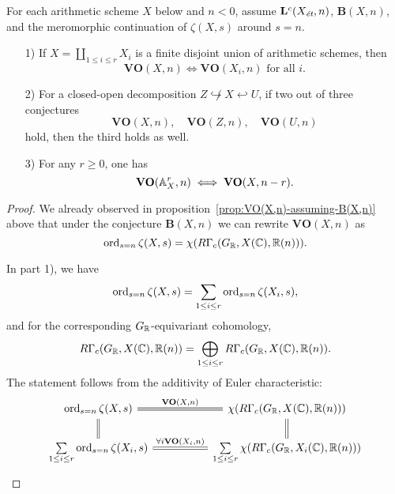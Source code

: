 \documentclass{article}
\numberwithin{equation}{section}
\begin{document}
\begin{proposition}
  \label{prop:compatibility-of-VO(X,n)}
  For each arithmetic scheme $X$ below and $n < 0$, assume
  $\mathbf{L}^c (X_\et,n)$, $\mathbf{B} (X,n)$, and the meromorphic continuation
  of $\zeta (X,s)$ around $s = n$.

  \begin{enumerate}
  \item[1)] If $X = \coprod_{1 \le i \le r} X_i$ is a finite disjoint union of
    arithmetic schemes, then
    $$\mathbf{VO} (X,n) \iff \mathbf{VO} (X_i,n)\text{ for all }i.$$

  \item[2)] For a closed-open decomposition
    $Z \not\hookrightarrow X \hookleftarrow U$, if two out of three conjectures
    \[ \mathbf{VO} (X,n), \quad
      \mathbf{VO} (Z,n), \quad
      \mathbf{VO} (U,n) \]
    hold, then the third holds as well.

  \item[3)] For any $r \ge 0$, one has
    $$\mathbf{VO} (\AA^r_X, n) \iff \mathbf{VO} (X, n-r).$$
  \end{enumerate}

  \begin{proof}
    We already observed in proposition~\ref{prop:VO(X,n)-assuming-B(X,n)} above
    that under the conjecture $\mathbf{B} (X,n)$ we can rewrite
    $\mathbf{VO} (X,n)$ as
    $$\ord_{s=n} \zeta (X,s) = \chi (R\Gamma_c (G_\RR, X(\CC), \RR (n))).$$

    In part 1), we have
    $$\ord_{s=n} \zeta (X,s) = \sum_{1 \le i \le r} \ord_{s=n} \zeta (X_i,s),$$
    and for the corresponding $G_\RR$-equivariant cohomology,
    \[ R\Gamma_c (G_\RR, X(\CC), \RR (n)) =
      \bigoplus_{1 \le i \le r} R\Gamma_c (G_\RR, X(\CC), \RR (n)). \]
    The statement follows from the additivity of Euler characteristic:
    \[ \begin{tikzcd}[column sep=5em]
        \ord_{s=n} \zeta (X,s) \ar[equals]{r}{\mathbf{VO} (X,n)}\ar[equals]{d} & \chi (R\Gamma_c (G_\RR, X(\CC), \RR (n))) \ar[equals]{d} \\
        \sum\limits_{1 \le i \le r} \ord_{s=n} \zeta (X_i,s) \ar[equals]{r}{\forall i \mathbf{VO} (X_i,n)} & \sum\limits_{1 \le i \le r} \chi (R\Gamma_c (G_\RR, X_i (\CC), \RR (n)))
      \end{tikzcd} \]


\end{proof}
\end{proposition}
\end{document}
